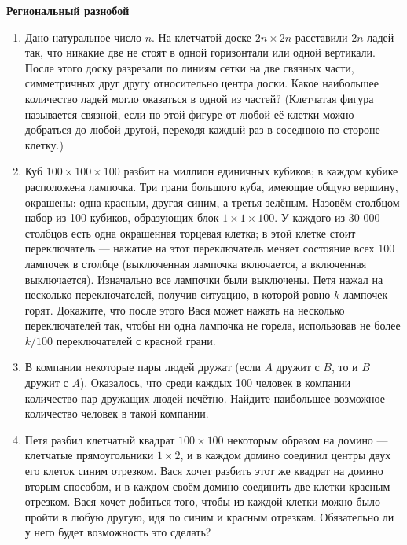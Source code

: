 \documentclass{article}
\begin{document}
\large
	
\begin{center}
	\textbf{Региональный разнобой}
\end{center}


\begin{enumerate}[label*=\protect\fbox{\arabic{enumi}}]
	
\item Дано натуральное число $n$. На клетчатой доске $2n \times 2n$ расставили $2n$ ладей так, что никакие две не стоят в одной горизонтали или одной вертикали. После этого доску разрезали по линиям сетки на две связных части, симметричных друг другу относительно центра доски. Какое наибольшее количество ладей могло оказаться в одной из частей? (Клетчатая фигура называется связной, если по этой фигуре от любой её клетки можно добраться до любой другой, переходя каждый раз в соседнюю
по стороне клетку.) 

\item Куб $100 \times 100 \times 100$ разбит на миллион единичных кубиков; в
каждом кубике расположена лампочка. Три грани большого куба, имеющие общую вершину, окрашены: одна красным, другая синим, а третья зелёным. Назовём столбцом набор из 100 кубиков, образующих блок $1\times 1\times 100$. У каждого из 30 000 столбцов есть одна окрашенная торцевая клетка; в этой клетке стоит переключатель — нажатие на этот переключатель меняет состояние всех 100 лампочек в столбце (выключенная лампочка включается, а включенная выключается). Изначально все лампочки были выключены. Петя нажал на несколько переключателей, получив ситуацию, в которой ровно $k$ лампочек горят. Докажите, что после этого Вася может нажать на несколько переключателей так, чтобы ни одна лампочка не горела, использовав не более $k/100$ переключателей с красной грани.

\item  В компании некоторые пары людей дружат (если $A$ дружит с $B$, то и $B$ дружит с $A$). Оказалось, что среди каждых 100 человек в компании количество пар дружащих людей нечётно. Найдите наибольшее возможное количество человек в такой компании.

\item  Петя разбил клетчатый квадрат $100 \times 100$ некоторым образом на домино — клетчатые прямоугольники $1 \times 2$, и в каждом домино соединил центры двух его клеток синим отрезком. Вася хочет разбить этот же квадрат на домино вторым способом, и в каждом своём домино соединить две клетки красным отрезком. Вася хочет добиться того, чтобы из каждой клетки можно было пройти в любую другую, идя по синим и красным отрезкам. Обязательно ли у него будет возможность это сделать?


\end{enumerate}
\end{document}
